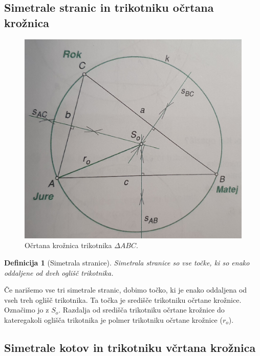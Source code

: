 \documentclass{article}
\newtheorem{definicija}{Definicija}[subsection]
\begin{document}
\pagebreak
\subsection{ Simetrale stranic in trikotniku očrtana krožnica }

\begin{figure}[h]
    \includegraphics[width=\linewidth]{ocrtanaKroznica.png}
    \centering
    \caption{Očrtana krožnica trikotnika $\Delta ABC$.}
\end{figure}

\begin{definicija}[Simetrala stranice]
    Simetrala stranice so vse točke, ki so enako oddaljene od dveh oglišč trikotnika.
\end{definicija}

Če narišemo vse tri simetrale stranic, dobimo točko, ki je enako oddaljena od vseh treh oglišč trikotnika. Ta točka je središče trikotniku očrtane krožnice. Označimo jo z $S_o$. Razdalja od središča trikotniku očrtane krožnice do kateregakoli oglišča trikotnika je polmer trikotniku očrtane krožnice ($r_o$).


\pagebreak
\subsection{ Simetrale kotov in trikotniku včrtana krožnica }
\end{document}
